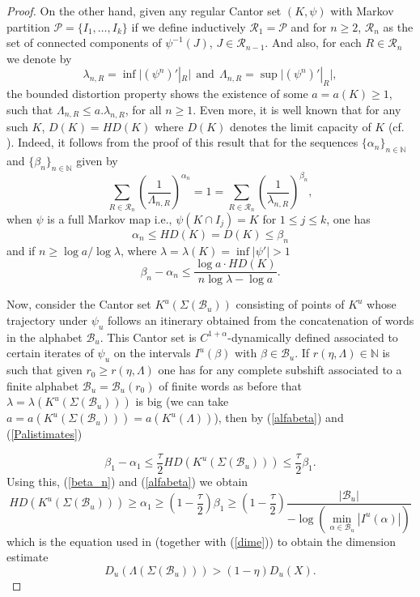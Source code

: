 \documentclass[12pt]{amsart}
\providecommand{\abs}[1]{\lvert#1\rvert}
\theoremstyle{plain} %
\theoremstyle{definition} %
\numberwithin{equation}{section}
\begin{document}
\begin{proof}
On the other hand, given any regular Cantor set $(K,\psi)$ with Markov partition $\mathcal{P}=\{I_1, \dots, I_k\}$ if we define inductively $\mathcal{R}_1=\mathcal{P}$ and for $n\geq 2$, $\mathcal{R}_n$ as the set of connected components of $\psi^{-1}(J)$, $J\in \mathcal{R}_{n-1}.$ And also, for each $R\in \mathcal{R}_n$ we denote by
$$ \lambda_{n, R}=\inf \abs{(\psi^n)'|_R} \ \ \text{and}\ \ \Lambda_{n, R}=\sup \abs{(\psi^n)'|_R},$$ 
the bounded distortion property shows the existence of some $a=a(K)\geq1$, such that $\Lambda_{n,R}\leq a . \lambda_{n,R}$, for all $n\geq 1$. Even more, it is well known that for any such $K$, $D(K)=HD(K)$ where $D(K)$ denotes the limit capacity of $K$ (cf. \cite[Chapter 4]{PT93}). Indeed, it follows from the proof of this result that for the sequences $\{ \alpha_n\}_{n\in \mathbb{N}}$ and $\{ \beta_n\}_{n\in \mathbb{N}}$ given by
\begin{equation}\label{beta_n}
  \sum \limits_{R\in \mathcal{R}_n} \left (\frac{1}{\Lambda_{n, R}}\right )^{\alpha_n}=1=\sum \limits_{R\in \mathcal{R}_n} \left (\frac{1}{\lambda_{n, R}}\right )^{\beta_n},   
\end{equation}
when $\psi$ is a full Markov map i.e., $\psi(K\cap I_j)=K$ for $1\leq j\leq k$, one has
\begin{equation}\label{alfabeta}
 \alpha_n \leq HD(K)=D(K)\leq \beta_n   
\end{equation}
and if $n\geq \log a/\log \lambda$, where $\lambda=\lambda(K)=\inf\abs{\psi'}>1$
\begin{equation}\label{Palistimates}
    \beta_n-\alpha_n\leq \frac{\log a\cdot HD(K)}{n\log \lambda-\log a}.
\end{equation}

Now, consider the Cantor set $K^u(\Sigma(\mathcal{B}_u))$ consisting of points of $K^u$ whose trajectory under $\psi_u$ follows an itinerary obtained from the concatenation of words in the alphabet $\mathcal{B}_u$. This Cantor set is $C^{1+\alpha}$-dynamically defined associated to certain iterates of $\psi_u$ on the intervals $I^u(\beta)$ with $\beta \in \mathcal{B}_u$. 
If $r(\eta,\Lambda)\in \mathbb{N}$ is such that given $r_0 \geq r(\eta,\Lambda)$ one has for any complete subshift associated to a finite alphabet $\mathcal{B}_u=\mathcal{B}_u(r_0)$ of finite words as before that $\lambda=\lambda(K^u(\Sigma(\mathcal{B}_u)))$ is big  (we can take $a=a(K^u(\Sigma(\mathcal{B}_u)))=a(K^u(\Lambda))$), then by (\ref{alfabeta}) and (\ref{Palistimates}) 

$$\beta_1-\alpha_1\leq \frac{\tau}{2} HD(K^u(\Sigma(\mathcal{B}_u)))\leq \frac{\tau}{2}\beta_1.$$
Using this, (\ref{beta_n}) and (\ref{alfabeta}) we obtain 
$$HD(K^u(\Sigma(\mathcal{B}_u)))\ge \alpha_1 \geq \left (1-\dfrac{\tau}{2}\right)\beta_1 \geq \left (1-\dfrac{\tau}{2}\right) \dfrac{| \mathcal{B}_u|}{- \log (\min\limits_{\alpha\in \mathcal{B}_u} |I^u(\alpha)|)}$$
which is the equation used in \cite{CMM16} (together with (\ref{dime})) to obtain the dimension estimate
$$D_u(\Lambda(\Sigma(\mathcal{B}_u)))>(1-\eta)D_u(X).$$


\end{proof}
\end{document}
